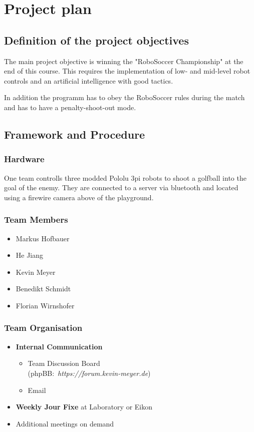 \documentclass[12pt]{article}
\begin{document}
\section{Project plan}
\subsection{Definition of the project objectives}
The main project objective is winning the "RoboSoccer Championship" at the end of this course. 
This requires the implementation of low- and mid-level robot controls and an artificial intelligence with good tactics.

In addition the programm has to obey the RoboSoccer rules during the match and has to have a penalty-shoot-out mode.

\subsection{Framework and Procedure}
\subsubsection*{Hardware}
One team controlls three modded Pololu 3pi robots to shoot a golfball into the goal of the enemy.
They are connected to a server via bluetooth and located using a firewire camera above of the playground.

\subsubsection*{Team Members}
\begin{itemize}
	\item Markus Hofbauer
	\item He Jiang
	\item Kevin Meyer
	\item Benedikt Schmidt
	\item Florian Wirnshofer
\end{itemize}

\subsubsection*{Team Organisation}
\begin{itemize}
	\item \textbf{Internal Communication}
	\begin{itemize}
		\item Team Discussion Board \\\mbox{(phpBB: \textit{https://forum.kevin-meyer.de})}
		\item Email
	\end{itemize}
	\item \textbf{Weekly Jour Fixe} at Laboratory or Eikon
	\item Additional meetings on demand
\end{itemize}
\end{document}
